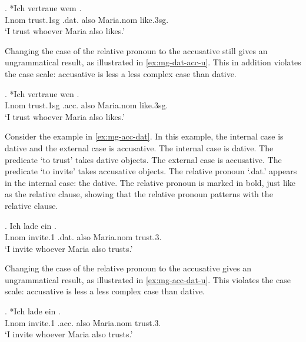 \exg. *Ich vertraue wem   . \\
I.\ac{nom} trust.1\ac{sg}\scsub{[dat]} .\ac{dat}. also Maria.\ac{nom} like.3\ac{sg}\scsub{[acc]}.\\
`I trust whoever Maria also likes.' \label{ex:mg-dat-acc}

Changing the case of the relative pronoun to the accusative still gives an ungrammatical result, as illustrated in \ref{ex:mg-dat-acc-u}. This in addition violates the case scale: accusative is less a less complex case than dative.

\exg. *Ich vertraue wen   . \\
I.\ac{nom} trust.1\ac{sg}\scsub{[dat]} .\ac{acc}. also Maria.\ac{nom} like.3\ac{sg}\scsub{[acc]}.\\
`I trust whoever Maria also likes.' \label{ex:mg-dat-acc-u}

Consider the example in \ref{ex:mg-acc-dat}. In this example, the internal case is dative and the external case is accusative.
The internal case is dative. The predicate  `to trust' takes dative objects.
The external case is accusative. The predicate  `to invite' takes accusative objects.
The relative pronoun  `.\ac{dat}.' appears in the internal case: the dative. The relative pronoun is marked in bold, just like as the relative clause, showing that the relative pronoun patterns with the relative clause.

\exg. Ich {lade ein}    . \\
I.\ac{nom} invite.1\scsub{[acc]} .\ac{dat}. also Maria.\ac{nom} trust.3\scsub{[dat]}.\\
`I invite whoever Maria also trusts.' \label{ex:mg-acc-dat}

Changing the case of the relative pronoun to the accusative gives an ungrammatical result, as illustrated in \ref{ex:mg-acc-dat-u}. This violates the case scale: accusative is less a less complex case than dative.

\exg. *Ich {lade ein}    . \\
I.\ac{nom} invite.1\scsub{[acc]} .\ac{acc}. also Maria.\ac{nom} trust.3\scsub{[dat]}.\\
`I invite whoever Maria also trusts.' \label{ex:mg-acc-dat-u}


